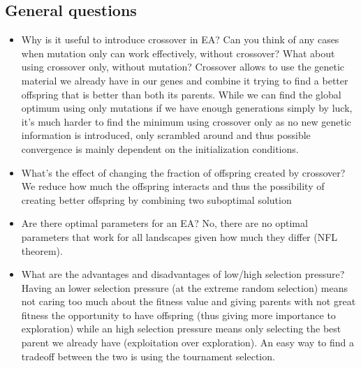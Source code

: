 \subsection{General questions}
\begin{itemize}
    \item Why is it useful to introduce crossover in EA? Can you think of any cases when mutation only can work effectively, without crossover? What about using crossover only, without mutation? Crossover allows to use the genetic material we already have in our genes and combine it trying to find a better offspring that is better than both its parents. While we can find the global optimum using only mutations if we have enough generations simply by luck, it's much harder to find the minimum using crossover only as no new genetic information is introduced, only scrambled around and thus possible convergence is mainly dependent on the initialization conditions.
    
    \item What's the effect of changing the fraction of offspring created by crossover? We reduce how much the offspring interacts and thus the possibility of creating better offspring by combining two suboptimal solution 
    
    \item Are there optimal parameters for an EA? No, there are no optimal parameters that work for all landscapes given how much they differ (NFL theorem).
    
    \item What are the advantages and disadvantages of low/high selection pressure? Having an lower selection pressure (at the extreme random selection) means not caring too much about the fitness value and giving parents with not great fitness the opportunity to have offspring (thus giving more importance to exploration) while an high selection pressure means only selecting the best parent we already have (exploitation over exploration). An easy way to find a tradeoff between the two is using the tournament selection. 
\end{itemize}